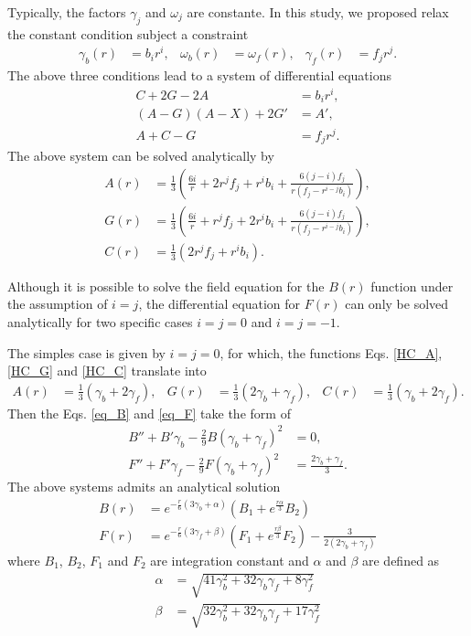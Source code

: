 \documentclass{article}
\begin{document}
Typically, the factors $\gamma_j$ and $\omega_j$ are constante. In this study, we proposed
relax the constant condition subject a constraint
\begin{align}
    \gamma_b(r) & = b_ir^{i}, & \omega_b(r) & = \omega_f(r), & \gamma_f(r) & = f_jr^{j}.
\end{align}
The above three conditions lead to a system of differential equations
\begin{align}
    C + 2G - 2A & = b_ir^{i}, \\
    \left(A - G\right)\left(A - X\right) + 2G' & = A',\\
    A + C - G & = f_jr^{j}.
\end{align}
The above system can be solved analytically by
\begin{align}
    A(r) & = \frac{1}{3}\left(\frac{6i}{r} + 2r^{j}f_j + r^{i}b_i + \frac{6\left(j - i\right)f_j}{r\left(f_j - r^{i - j}b_i\right)}\right), \label{HC_A} \\
    G(r) & = \frac{1}{3}\left(\frac{6i}{r} + r^{j}f_j + 2r^{i}b_i + \frac{6\left(j - i\right)f_j}{r\left(f_j - r^{i - j}b_i\right)}\right), \label{HC_G}\\
    C(r) & = \frac{1}{3}\left(2r^{j}f_j + r^{i}b_i\right) \label{HC_C}.
\end{align}

Although it is possible to solve the field equation for the $B(r)$ function under the
assumption of $i = j$, the differential equation for $F(r)$ can only be solved analytically
for two specific cases $i = j = 0$ and $i = j = -1$. 

The simples case is given by $i = j = 0$, for which, the functions Eqs. \eqref{HC_A}, \eqref{HC_G}
and \eqref{HC_C} translate into 
\begin{align}
    A(r) & = \frac{1}{3}\left(\gamma_b + 2\gamma_f\right), & 
    G(r) & = \frac{1}{3}\left(2\gamma_b + \gamma_f\right), &
    C(r) & = \frac{1}{3}\left(\gamma_b + 2\gamma_f\right).
\end{align}
Then the Eqs. \eqref{eq_B} and \eqref{eq_F} take the form of
\begin{align}
    B'' + B'\gamma_b - \frac{2}{9}B\left(\gamma_b + \gamma_f\right)^2 & = 0, \\ 
    F'' + F'\gamma_f - \frac{2}{9}F\left(\gamma_b + \gamma_f\right)^2  & = \frac{2\gamma_b + \gamma_f}{3}.
\end{align}
The above systems admits an analytical solution
\begin{align}
    B(r) & = e^{-\frac{r}{6}\left(3\gamma_b + \alpha\right)}\left(B_1 + e^{\frac{r\alpha}{3}}B_2\right) \\
    F(r) & = e^{-\frac{r}{6}\left(3\gamma_f + \beta\right)}\left(F_1 + e^{\frac{r\beta}{3}}F_2\right) - \frac{3}{2\left(2\gamma_b + \gamma_f\right)}
\end{align}
where $B_1$, $B_2$, $F_1$ and $F_2$ are integration constant and $\alpha$ and $\beta$ are defined as 
\begin{align}
    \alpha & = \sqrt{41\gamma_b^2 + 32\gamma_b\gamma_f + 8\gamma_f^2} \\
    \beta  & = \sqrt{32\gamma_b^2 + 32\gamma_b\gamma_f + 17\gamma_f^2} 
\end{align}
\end{document}

